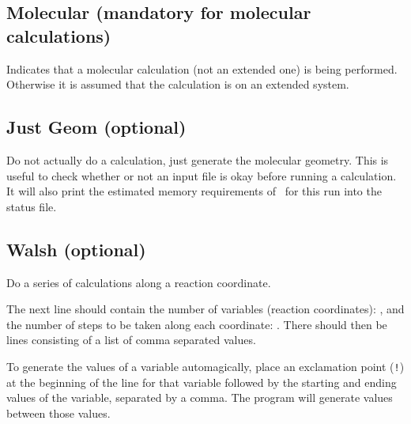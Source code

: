 \subsection{{\sf Molecular} (mandatory for molecular calculations)}

Indicates that a molecular calculation (not an extended one) is being
performed.  Otherwise it is assumed that the calculation is on an
extended system.





\subsection{{\sf Just Geom} (optional)}

Do not actually do a calculation, just generate the molecular
geometry.  This is useful to check whether or not an input file is
okay before running a calculation.  It will also print the estimated
memory requirements of \calcprog\ for this run into the status file.


\subsection{{\sf Walsh} (optional)}

Do a series of calculations along a reaction coordinate. 

The next line should contain the number of variables (reaction
coordinates): , and the number of steps to be taken
along each coordinate: .  There should then be
 lines consisting of a list of comma separated
values.  

To generate the values of a variable automagically, place an
exclamation point ({\tt !}) at the beginning of the line for that
variable followed by the starting and ending values of the variable,
separated by a comma.
The program will generate  values between those
values.  

